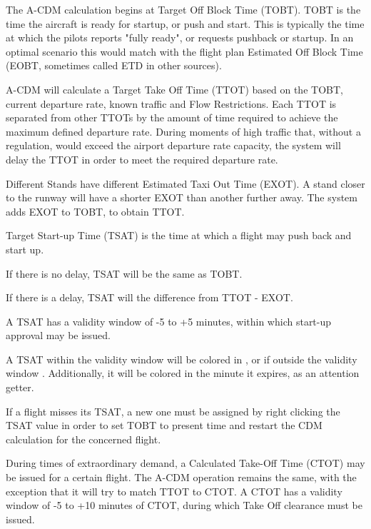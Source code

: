 \documentclass[a4paper,oneside,11pt]{memoir}
\begin{document}
\medskip

The A-CDM calculation begins at Target Off Block Time (TOBT). TOBT is the time the aircraft is ready for startup, or push and start. This is typically the time at which the pilots reports "fully ready", or requests pushback or startup. In an optimal scenario this would match with the flight plan Estimated Off Block Time (EOBT, sometimes called ETD in other sources).

\medskip

A-CDM will calculate a Target Take Off Time (TTOT) based on the TOBT, current departure rate, known traffic and Flow Restrictions. Each TTOT is separated from other TTOTs by the amount of time required to achieve the maximum defined departure rate. During moments of high traffic that, without a regulation, would exceed the airport departure rate capacity, the system will delay the TTOT in order to meet the required departure rate. 

\medskip

Different Stands have different Estimated Taxi Out Time (EXOT). A stand closer to the runway will have a shorter EXOT than another further away. The system adds EXOT to TOBT, to obtain TTOT.

\bigskip

Target Start-up Time (TSAT) is the time at which a flight may push back and start up. 

If there is no delay, TSAT will be the same as TOBT. 

If there is a delay, TSAT will the difference from TTOT - EXOT. 

A TSAT has a validity window of -5 to +5 minutes, within which start-up approval may be issued. 

A TSAT within the validity window will be colored in , or if outside the validity window . Additionally, it will be colored in  the minute it expires, as an attention getter.

If a flight misses its TSAT, a new one must be assigned by right clicking the TSAT value in order to set TOBT to present time and restart the CDM calculation for the concerned flight.

\medskip

During times of extraordinary demand, a Calculated Take-Off Time (CTOT) may be issued for a certain flight. The A-CDM operation remains the same, with the exception that it will try to match TTOT to CTOT. A CTOT has a validity window of -5 to +10 minutes of CTOT, during which Take Off clearance must be issued.
\end{document}
